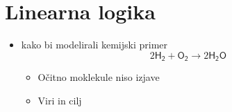 \documentclass[12pt, titlepage, a4paper]{article}
\newcommand{\AXC}[1]{\AxiomC{#1}}
\newcommand{\UIC}[1]{\UnaryInfC{#1}}
\newcommand{\TIC}[1]{\TrinaryInfC{#1}}
\newcommand{\RL}[1]{\RightLabel{#1}}
\newcommand{\G}{\Gamma}
\newenvironment{bprooftree}
  {\leavevmode\hbox\bgroup}
  {\DisplayProof\egroup}
\begin{document}
\begin{itemize}


\end{itemize}
\section{Linearna logika}
    \begin{itemize}
        \item kako bi modelirali kemijski primer
        \begin{equation*}
            2 \mathsf{H_2} + \mathsf{O_2} \rightarrow 2 \mathsf{H_2 O}
        \end{equation*}
        
        \begin{itemize}
            \item Očitno moklekule niso izjave
            \item Viri in cilj
        \end{itemize}
    \end{itemize}
\end{document}
